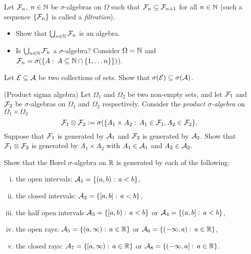\begin{problem} Let $\mathcal F_n$, $n\in \mathbb N$ be $\sigma$-algebras on $\Omega$ such that $\mathcal F_{n}\subseteq \mathcal F_{n+1}$ for all $n\in \mathbb N$ (such a sequence $\{\mathcal F_n\}$ is called a \emph{filtration}). 
    \begin{itemize}
        \item Show that $\bigcup_{n\in \mathbb N} \mathcal F_n$ is an algebra.
        \item Is $\bigcup_{n\in \mathbb N} \mathcal F_n$ a $\sigma$-algebra? Consider $\Omega=\mathbb N$ and $\mathcal F_n = \sigma(\{A:\,A\subseteq \mathbb N \cap \{1,\ldots n\}\})$).
    \end{itemize}
\end{problem}

\begin{problem}
    Let $\mathcal E\subseteq \mathcal A$ be two collections of sets. Show that $\sigma(\mathcal E) \subseteq\sigma(\mathcal A)$. 
\end{problem}

\begin{problem}(Product sigma algebra) Let $\Omega_1$ and $\Omega_2$ be two non-empty sets, and let $\mathcal F_1$ and $\mathcal F_2$ be $\sigma$-algebras on $\Omega_1$ and $\Omega_2$ respectively.
Consider the \emph{product $\sigma$-algebra} on $\Omega_1\times \Omega_2$
\begin{equation*}
    \mathcal F_1\otimes\mathcal F_2 := \sigma(\{A_1\times A_2:\, A_1\in \mathcal F_1, A_2\in \mathcal F_2\}.
\end{equation*}
Suppose that $\mathcal F_1$ is generated by $\mathcal A_1$ and $\mathcal F_2$ is generated by $\mathcal A_2$. Show that  $ \mathcal F_1\otimes\mathcal F_2$ is generated by $A_1\times A_2$ with $A_1\in \mathcal A_1$ and $A_2\in \mathcal A_2$.
\end{problem}

\begin{problem}
    Show that the Borel $\sigma$-algebra on $\mathbb R$ is generated by each of the following:
    \begin{enumerate}[i.] 
        \item the open intervals: $\mathcal A_1 = \{(a,b):\, a<b\}$,
        \item the closed intervals: $\mathcal A_2 = \{[a,b]:\, a < b\}$,
        \item the half open intervals $\mathcal A_3 = \{[a,b):\, a < b\}$ or $\mathcal A_4 = \{(a,b]:\, a < b\}$,
        \item the open rays: $\mathcal A_5 = \{(a,\infty):\, a\in \mathbb R\}$ or $\mathcal A_6 = \{(-\infty,a):\, a\in \mathbb R\}$,
        \item the closed rays: $\mathcal A_7 = \{[a,\infty):\, a\in \mathbb R\}$ or $\mathcal A_8 = \{(-\infty,a]:\, a\in \mathbb R\}$.
    \end{enumerate}
\end{problem}

